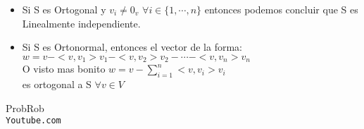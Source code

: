 \documentclass[12pt]{report}							    %
\begin{document}
        \begin{itemize}
            \item Si S es Ortogonal y $v_i \neq 0_v$ $\forall i \in \{1, \cdots, n\}$
            entonces podemos concluir que S es Linealmente independiente.

            \item Si S es Ortonormal, entonces el vector de la forma:\\
            $ w = v - <v, v_1> v_1 - <v, v_2> v_2 - \cdots - <v, v_n> v_n $\\
            O visto mas bonito $w = v - \sum_{i = 1}^{n} <v, v_i>v_i$\\
            es ortogonal a S $\forall v \in V$
        \end{itemize}



\clearpage

	\begin{thebibliography}{9}

		ProbRob
		\\\texttt{Youtube.com}


	 

\end{thebibliography}
\end{document}
